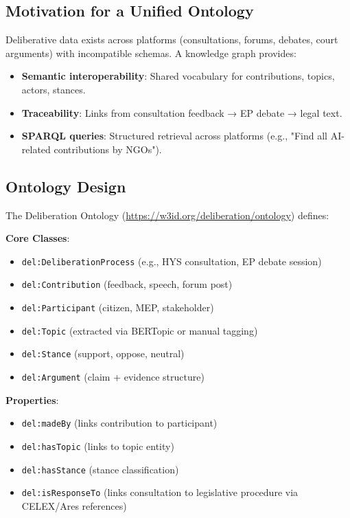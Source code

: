 \documentclass[sigconf,natbib]{acmart}
\begin{document}
\subsection{Motivation for a Unified Ontology}
Deliberative data exists across platforms (consultations, forums, debates, court arguments) with incompatible schemas. A knowledge graph provides:
\begin{itemize}
  \item \textbf{Semantic interoperability}: Shared vocabulary for contributions, topics, actors, stances.
  \item \textbf{Traceability}: Links from consultation feedback → EP debate → legal text.
  \item \textbf{SPARQL queries}: Structured retrieval across platforms (e.g., "Find all AI-related contributions by NGOs").
\end{itemize}

\subsection{Ontology Design}
The Deliberation Ontology (\url{https://w3id.org/deliberation/ontology}) defines:

\textbf{Core Classes}:
\begin{itemize}
  \item \texttt{del:DeliberationProcess} (e.g., HYS consultation, EP debate session)
  \item \texttt{del:Contribution} (feedback, speech, forum post)
  \item \texttt{del:Participant} (citizen, MEP, stakeholder)
  \item \texttt{del:Topic} (extracted via BERTopic or manual tagging)
  \item \texttt{del:Stance} (support, oppose, neutral)
  \item \texttt{del:Argument} (claim + evidence structure)
\end{itemize}

\textbf{Properties}:
\begin{itemize}
  \item \texttt{del:madeBy} (links contribution to participant)
  \item \texttt{del:hasTopic} (links to topic entity)
  \item \texttt{del:hasStance} (stance classification)
  \item \texttt{del:isResponseTo} (links consultation to legislative procedure via CELEX/Ares references)
\end{itemize}
\end{document}
